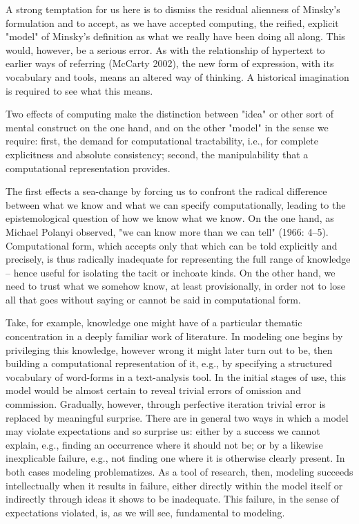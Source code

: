 A strong temptation for us here is to dismiss the residual alienness of Minsky's formulation and to accept, as we have accepted computing, the reified, explicit "model" of Minsky's definition as what we really have been doing all along. This would, however, be a serious error. As with the relationship of hypertext to earlier ways of referring (McCarty 2002), the new form of expression, with its vocabulary and tools, means an altered way of thinking. A historical imagination is required to see what this means.

Two effects of computing make the distinction between "idea" or other sort of mental construct on the one hand, and on the other "model" in the sense we require: first, the demand for computational tractability, i.e., for complete explicitness and absolute consistency; second, the manipulability that a computational representation provides.

The first effects a sea-change by forcing us to confront the radical difference between what we know and what we can specify computationally, leading to the epistemological question of how we know what we know. On the one hand, as Michael Polanyi observed, "we can know more than we can tell" (1966: 4–5). Computational form, which accepts only that which can be told explicitly and precisely, is thus radically inadequate for representing the full range of knowledge – hence useful for isolating the tacit or inchoate kinds. On the other hand, we need to trust what we somehow know, at least provisionally, in order not to lose all that goes without saying or cannot be said in computational form.

Take, for example, knowledge one might have of a particular thematic concentration in a deeply familiar work of literature. In modeling one begins by privileging this knowledge, however wrong it might later turn out to be, then building a computational representation of it, e.g., by specifying a structured vocabulary of word-forms in a text-analysis tool. In the initial stages of use, this model would be almost certain to reveal trivial errors of omission and commission. Gradually, however, through perfective iteration trivial error is replaced by meaningful surprise. There are in general two ways in which a model may violate expectations and so surprise us: either by a success we cannot explain, e.g., finding an occurrence where it should not be; or by a likewise inexplicable failure, e.g., not finding one where it is otherwise clearly present. In both cases modeling problematizes. As a tool of research, then, modeling succeeds intellectually when it results in failure, either directly within the model itself or indirectly through ideas it shows to be inadequate. This failure, in the sense of expectations violated, is, as we will see, fundamental to modeling.


